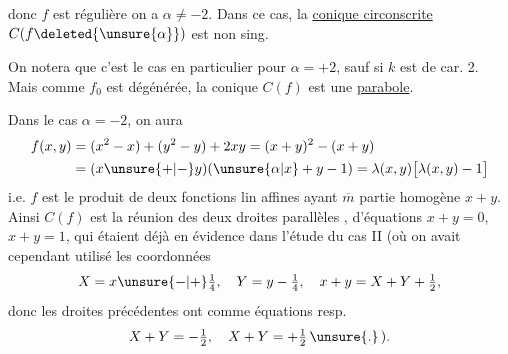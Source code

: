 donc $f$ est régulière  on a $\alpha\ne-2$. Dans ce cas, la \uline{conique circonscrite} $C(f\deleted{\unsure{\alpha}})$ est non sing.

On notera que c'est le cas en particulier pour $\alpha=+2$, sauf si $k$ est de car. 2. Mais comme $f_0$ est dégénérée, la conique $C(f)$ est une \uline{parabole}.

Dans le cas $\alpha=-2$, on aura
\[
\begin{aligned}
f(x,y)&=(x^2-x)+(y^2-y)+2xy=(x+y)^2-(x+y)\\
&=(x\unsure{+|-}y)(\unsure{\alpha|x}+y-1)=\lambda(x,y)\big[\lambda(x,y)-1\big]
\end{aligned}
\]
i.e. $f$ est le produit de deux fonctions lin affines ayant $\overline{m}$ partie homogène $x+y$. Ainsi $C(f)$ est la réunion des deux droites parallèles\unsure{,} , d'équations $x+y=0$, $x+y=1$, qui étaient déjà en évidence dans l'étude du cas II (où on avait cependant utilisé les coordonnées
\[
X=x\unsure{-|+}\tfrac14,\quad Y=y-\tfrac14,\quad x+y=X+Y+\tfrac12,
\]
donc les droites précédentes ont comme équations resp.
\[
X+Y=-\tfrac12,\quad X+Y=+\tfrac12\,\unsure{.}\,).
\]
